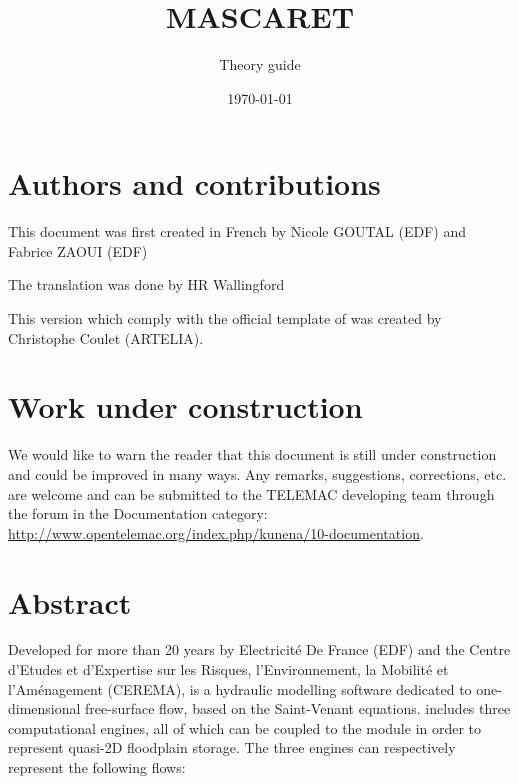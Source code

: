 \documentclass[Mascaret]{../../data/TelemacDoc} %
\begin{document}
\let\cleardoublepage\clearpage
\title{MASCARET}
\subtitle{Theory guide}
\version{\telmaversion}
\author{}
\date{\today}
\maketitle
\clearpage


\newpage

\thispagestyle{empty}

\chapter*{Authors and contributions}
This document was first created in French by Nicole GOUTAL (EDF) and Fabrice ZAOUI (EDF)

The translation was done by HR Wallingford

This version which comply with the official template of \telemacsystem{} was created by Christophe Coulet (ARTELIA).

\newpage

\chapter*{Work under construction}\label{workunderconstruction}
We would like to warn the reader that this document is still under construction and
could be improved in many ways. Any remarks, suggestions, corrections, etc. are welcome
and can be submitted to the TELEMAC developing team through the forum in the Documentation
category: \url{http://www.opentelemac.org/index.php/kunena/10-documentation}.

\newpage

\chapter*{Abstract}\label{Abstract}
Developed for more than 20 years by Electricité De France (EDF) and the Centre d'Etudes et d'Expertise sur les Risques, l'Environnement, la Mobilité et l'Aménagement (CEREMA), \mascaret{} is a hydraulic modelling software dedicated to one-dimensional free-surface flow, based on the Saint-Venant equations.
\mascaret{} includes three computational engines, all of which can be coupled to the \casier{} module in order to represent quasi-2D floodplain storage. The three engines can respectively represent the following flows:
\end{document}
